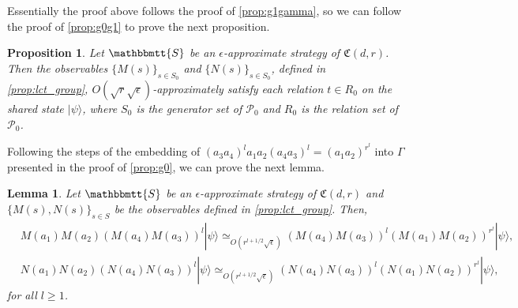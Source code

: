 \documentclass[11pt,letterpaper]{article}
\newcommand{\ket}[1]{|#1\rangle}
\newcommand{\1}{\mathbb{1}}
\newcommand{\Pg}{\mathcal{P}}
\newcommand{\fC}{\mathfrak{C}}
\newcommand{\bS}{\mathbbmtt{S}}
\newcommand{\ep}{\epsilon}
\newcommand{\se}{\sqrt{\epsilon}}
\newcommand{\sr}{\sqrt{r}}
\newcommand{\appd}[1]{\simeq_{#1}}
\newtheorem{lemma}[theorem]{Lemma}
\newtheorem{proposition}[theorem]{Proposition}
\theoremstyle{definition}
\begin{document}
Essentially the proof above follows the proof of 
\cref{prop:g1gamma},
so we can follow the proof of \cref{prop:g0g1}
to prove the next proposition.
\begin{proposition}
    \label{prop:lct_pg0}
    Let $\bS$ be an $\ep$-approximate strategy of $\fC(d,r)$.
	Then the observables $\{ M(s) \}_{s \in S_0}$ and 
	$\{N(s)\}_{s \in S_0}$, defined in 
\cref{prop:lct_group}, $O(\sr \se)$-approximately satisfy
	each relation $t \in R_0$ on the shared state $\ket{\psi}$, 
	where $S_0$ is the generator set of $\Pg_0$
    and $R_0$ is the relation set of $\Pg_0$.
\end{proposition}
Following the steps of the embedding of $(a_3a_4)^l a_1a_2(a_4a_3)^l = (a_1a_2)^{r^l}$ into $\Gamma$ presented in
the proof of \cref{prop:g0},
we can prove the next lemma.
\begin{lemma}
\label{prop:lct_adv}
Let $\bS$ be an $\ep$-approximate strategy of $\fC(d,r)$ and $\{M(s), N(s)\}_{s \in S}$ be the observables defined in 
\cref{prop:lct_group}. 
Then,
\begin{align}
	&M(a_1)M(a_2) (M(a_4)M(a_3))^l \ket{\psi}\appd{O(r^{l+1/2} \se)} (M(a_4)M(a_3))^l (M(a_1)M(a_2))^{r^l} \ket{\psi}, \\
	&N(a_1)N(a_2) (N(a_4)N(a_3))^l \ket{\psi}\appd{O(r^{l+1/2} \se)} (N(a_4)N(a_3))^l (N(a_1)N(a_2))^{r^l} \ket{\psi}, 
\end{align}
for all $l \geq 1$.
\end{lemma}
\end{document}

